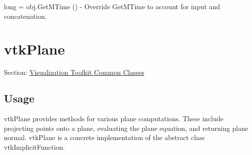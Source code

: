 \begin{DoxyItemize}
\item {\ttfamily long = obj.\-Get\-M\-Time ()} -\/ Override Get\-M\-Time to account for input and concatenation.  
\end{DoxyItemize}\hypertarget{vtkcommon_vtkplane}{}\section{vtk\-Plane}\label{vtkcommon_vtkplane}
Section\-: \hyperlink{sec_vtkcommon}{Visualization Toolkit Common Classes} \hypertarget{vtkwidgets_vtkxyplotwidget_Usage}{}\subsection{Usage}\label{vtkwidgets_vtkxyplotwidget_Usage}
vtk\-Plane provides methods for various plane computations. These include projecting points onto a plane, evaluating the plane equation, and returning plane normal. vtk\-Plane is a concrete implementation of the abstract class vtk\-Implicit\-Function.

